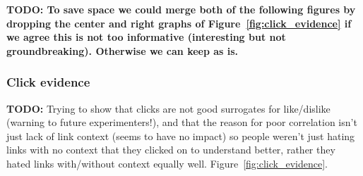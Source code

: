 {\bf TODO: To save space we could merge both of the following
figures by dropping the center and right graphs of Figure~\ref{fig:click_evidence}
if we agree this is not too informative (interesting but not groundbreaking).
Otherwise we can keep as is.}

\subsubsection{Click evidence}

{\bf TODO:} Trying to show that clicks are not good
surrogates for like/dislike (warning to future experimenters!),
and that the reason for poor correlation isn't just lack of link context (seems
to have no impact) so people weren't just hating links with no context
that they clicked on to understand better, rather 
they hated links with/without context equally well.
Figure~\ref{fig:click_evidence}.

